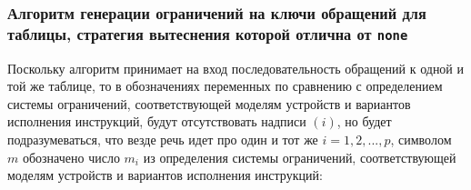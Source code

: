 \subsubsection*{Алгоритм генерации ограничений на ключи обращений для таблицы,
стратегия вытеснения которой отлична от \texttt{none}}

Поскольку алгоритм принимает на вход последовательность обращений к одной и той же таблице, то в обозначениях переменных по сравнению с определением системы ограничений, соответствующей моделям устройств и вариантов исполнения инструкций, будут отсутствовать надписи $(i)$, но будет подразумеваться, что везде речь идет про один и тот же $i = 1, 2, ..., p$, символом $m$ обозначено число $m_i$ из определения системы ограничений, соответствующей моделям устройств и вариантов исполнения инструкций: %

